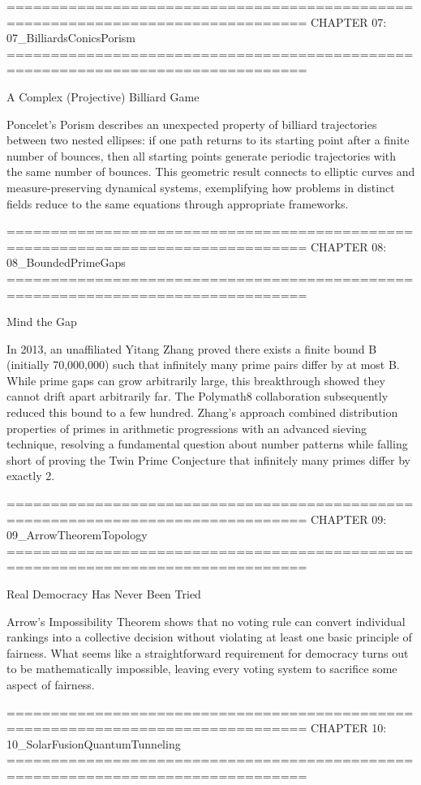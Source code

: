 ================================================================================
CHAPTER 07: 07_BilliardsConicsPorism
================================================================================

A Complex (Projective) Billiard Game

Poncelet's Porism describes an unexpected property of billiard trajectories between two nested ellipses: if one path returns to its starting point after a finite number of bounces, then all starting points generate periodic trajectories with the same number of bounces. This geometric result connects to elliptic curves and measure-preserving dynamical systems, exemplifying how problems in distinct fields reduce to the same equations through appropriate frameworks.


================================================================================
CHAPTER 08: 08_BoundedPrimeGaps
================================================================================

Mind the Gap

In 2013, an unaffiliated Yitang Zhang proved there exists a finite bound B (initially 70,000,000) such that infinitely many prime pairs differ by at most B. While prime gaps can grow arbitrarily large, this breakthrough showed they cannot drift apart arbitrarily far. The Polymath8 collaboration subsequently reduced this bound to a few hundred. Zhang's approach combined distribution properties of primes in arithmetic progressions with an advanced sieving technique, resolving a fundamental question about number patterns while falling short of proving the Twin Prime Conjecture that infinitely many primes differ by exactly 2.


================================================================================
CHAPTER 09: 09_ArrowTheoremTopology
================================================================================

Real Democracy Has Never Been Tried

Arrow’s Impossibility Theorem shows that no voting rule can convert individual rankings into a collective decision without violating at least one basic principle of fairness. What seems like a straightforward requirement for democracy turns out to be mathematically impossible, leaving every voting system to sacrifice some aspect of fairness.


================================================================================
CHAPTER 10: 10_SolarFusionQuantumTunneling
================================================================================

